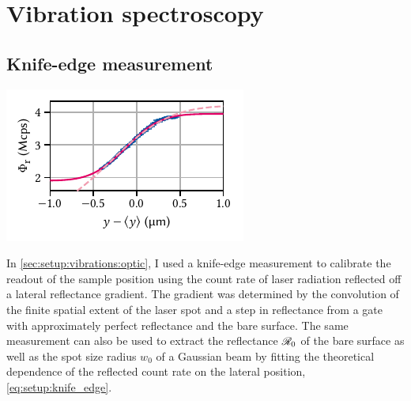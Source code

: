 \chapter{Vibration spectroscopy}\label{ch:app:setup:vibrations}
\section{Knife-edge measurement}\label{sec:app:setup:vibrations:knife_edge}
\begin{marginfigure}
    \centering
    \includegraphics{img/pdf/setup/knife_edge_erf}
    \caption[]{
    }
    \label{fig:app:setup:vibrations:knife_edge}
\end{marginfigure}

In \cref{sec:setup:vibrations:optic}, I used a knife-edge measurement to calibrate the readout of the sample position using the count rate of laser radiation reflected off a lateral reflectance gradient.
The gradient was determined by the convolution of the finite spatial extent of the laser spot and a step in reflectance from a  gate with approximately perfect reflectance and the bare  surface.
The same measurement can also be used to extract the reflectance $\mathscr{R}_{0}$ of the bare  surface as well as the spot size radius $w_0$ of a Gaussian beam by fitting the theoretical dependence of the reflected count rate on the lateral position, \cref{eq:setup:knife_edge}.

